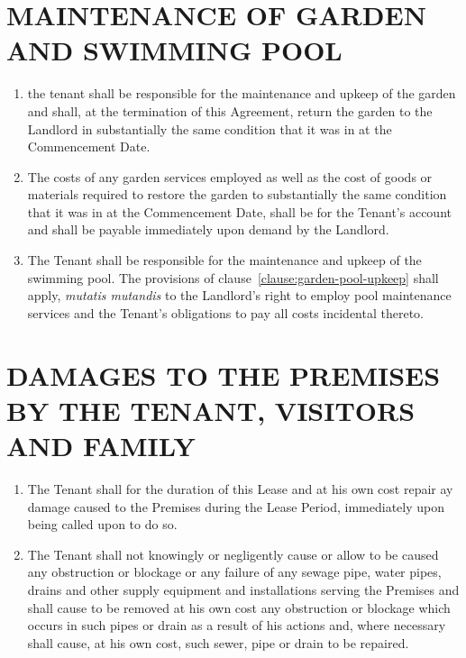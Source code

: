 \documentclass[11pt]{article}
\begin{document}
\section{\uppercase{maintenance of garden and swimming pool}}
\label{sec:maintenance-of-garden-and-swimming-pool}

\begin{enumerate}
	\item the tenant shall be responsible for the maintenance and upkeep of the garden and shall, at the termination of this Agreement, return the garden to the Landlord in substantially the same condition that it was in at the Commencement Date.
	\item The costs of any garden services employed as well as the cost of goods or materials required to restore the garden to substantially the same condition that it was in at the Commencement Date, shall be for the Tenant's account and shall be payable immediately upon demand by the Landlord. \label{clause:garden-pool-upkeep}
	\item The Tenant shall be responsible for the maintenance and upkeep of the swimming pool. The provisions of clause~\ref{clause:garden-pool-upkeep} shall apply, \textit{mutatis mutandis} to the Landlord's right to employ pool maintenance services and the Tenant's obligations to pay all costs incidental thereto.
\end{enumerate}

\section{\uppercase{damages to the premises by the tenant, visitors and family}}
\label{sec:premises-damages-by-tenant}

\begin{enumerate}
	\item The Tenant shall for the duration of this Lease and at his own cost repair ay damage caused to the Premises during the Lease Period, immediately upon being called upon to do so.
	\item The Tenant shall not knowingly or negligently cause or allow to be caused any obstruction or blockage or any failure of any sewage pipe, water pipes, drains and other supply equipment and installations serving the Premises and shall cause to be removed at his own cost any obstruction or blockage which occurs in such pipes or drain as a result of his actions and, where necessary shall cause, at his own cost, such sewer, pipe or drain to be repaired.
\end{enumerate}
\end{document}
